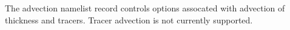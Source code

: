 The advection namelist record controls options assocated with advection of thickness and tracers.  Tracer advection is not currently supported.
